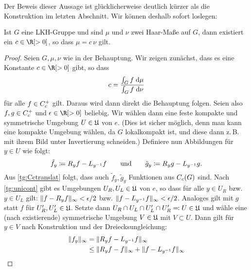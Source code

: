 
\bigskip
\noindent
Der Beweis dieser Aussage ist glücklicherweise deutlich kürzer als die
Konstruktion im letzten Abschnitt. Wir können deshalb sofort loslegen: 

\begin{thSatz}
    Ist $G$ eine LKH-Gruppe und sind $\mu$ und $\nu$ zwei Haar-Maße auf $G$,
    dann existiert ein $c\in\R[>0]$, so dass $\mu = c\,\nu$ gilt.
\end{thSatz}

\begin{proof}
    Seien $G,\mu,\nu$ wie in der Behauptung. Wir zeigen zunächst, dass es eine
    Konstante $c\in\R[>0]$ gibt, so dass
    \[ c = \frac{\int_G f \;\mathrm{d} \mu}{\int_G f \;\mathrm{d} \nu} \]
    für alle $f\in C_c^+$ gilt. Daraus wird dann direkt die Behauptung
    folgen. Seien also $f,g\in C_c^+$ und $\epsilon\in\R[>0]$
    beliebig. Wir wählen dann eine feste kompakte und symmetrische Umgebung
    $U\in\mathfrak{U}$ von $e$. (Dies ist sicher möglich, denn man kann eine
    kompakte Umgebung wählen, da $G$ lokalkompakt ist, und diese dann z.\,B. mit
    ihrem Bild unter Invertierung schneiden.) 
    Definiere nun Abbildungen für $y\in U$ wie folgt:
    \[  \tilde f_y \coloneqq R_yf - L_{y^{-1}}f
        \qquad\text{und}\qquad
        \tilde g_y \coloneqq R_yg - L_{y^{-1}}g
    . \]
    Aus \cref{tg:Cctranslat} folgt, dass auch $\tilde f_y,\tilde g_y$ Funktionen
    aus $C_c(G)$ sind. Nach \cref{tg:unicont} gibt es Umgebungen
    $U_R,U_L\in\mathfrak{U}$ von $e$, so dass für alle $y\in U_R$ bzw. $y\in U_L$
    gilt: 
    $\lVert f-R_yf\rVert_\infty<\epsilon/2$ bzw. $\lVert f-L_{y^{-1}}f\rVert_\infty<\epsilon/2$.
    Analoges gilt mit $g$ statt $f$ für $U_R',U_L'\in\mathfrak{U}$.
    Setzte dann $U_R\cap U_L\cap U_L'\cap U_R' \eqqcolon U \in\mathfrak{U}$
    und wähle eine (nach  existierende) symmetrische
    Umgebung $V\in\mathfrak{U}$ mit $V\subset U$. Dann gilt für $y\in V$ nach
    Konstruktion und der Dreiecksungleichung:
    \begin{align*}
        \supnorm{ f_y }                                                 %
        &=    \supnorm{ R_yf - L_{y^{-1}}f }                            \\
        &\leq \supnorm{ R_yf - f } + \supnorm{ f - L_{y^{-1}}f }        \\

\end{align*}
\end{proof}
